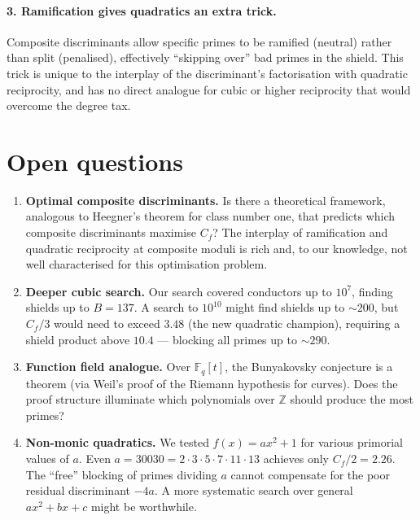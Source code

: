 \documentclass[11pt,a4paper]{article}
\theoremstyle{definition}
\theoremstyle{remark}
\newcommand{\Z}{\mathbb{Z}}
\begin{document}
\paragraph{3. Ramification gives quadratics an extra trick.}
Composite discriminants allow specific primes to be ramified (neutral) rather than split (penalised), effectively ``skipping over'' bad primes in the shield.
This trick is unique to the interplay of the discriminant's factorisation with quadratic reciprocity, and has no direct analogue for cubic or higher reciprocity that would overcome the degree tax.


\section{Open questions}\label{sec:open}

\begin{enumerate}
\item \textbf{Optimal composite discriminants.}
Is there a theoretical framework, analogous to Heegner's theorem for class number one, that predicts which composite discriminants maximise $C_f$?
The interplay of ramification and quadratic reciprocity at composite moduli is rich and, to our knowledge, not well characterised for this optimisation problem.

\item \textbf{Deeper cubic search.}
Our search covered conductors up to $10^7$, finding shields up to $B = 137$.
A search to $10^{10}$ might find shields up to $\sim\!200$, but $C_f/3$ would need to exceed $3.48$ (the new quadratic champion), requiring a shield product above $10.4$ --- blocking all primes up to $\sim\!290$.

\item \textbf{Function field analogue.}
Over $\mathbb{F}_q[t]$, the Bunyakovsky conjecture is a theorem (via Weil's proof of the Riemann hypothesis for curves).
Does the proof structure illuminate which polynomials over $\Z$ should produce the most primes?

\item \textbf{Non-monic quadratics.}
We tested $f(x) = ax^2 + 1$ for various primorial values of $a$.
Even $a = 30030 = 2 \cdot 3 \cdot 5 \cdot 7 \cdot 11 \cdot 13$ achieves only $C_f/2 = 2.26$.
The ``free'' blocking of primes dividing $a$ cannot compensate for the poor residual discriminant $-4a$.
A more systematic search over general $ax^2 + bx + c$ might be worthwhile.
\end{enumerate}
\end{document}
